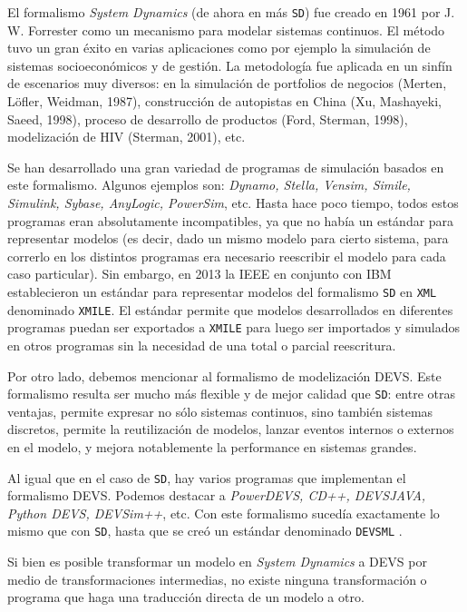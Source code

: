 
El formalismo \textit{System Dynamics} (de ahora en más \texttt{SD}) fue creado en 1961 por J. W.
Forrester como un mecanismo para modelar sistemas continuos. El método tuvo un
gran éxito en varias aplicaciones como por ejemplo la simulación de sistemas
socioeconómicos y de gestión. La metodología fue aplicada en un sinfín de
escenarios muy diversos: en la simulación de portfolios de negocios (Merten,
Löfler, Weidman, 1987), construcción de autopistas en China (Xu, Mashayeki,
Saeed, 1998), proceso de desarrollo de productos (Ford, Sterman, 1998),
modelización de HIV (Sterman, 2001), etc.


Se han desarrollado una gran variedad de programas de simulación basados en este formalismo. Algunos ejemplos son: \textit{Dynamo, Stella, Vensim, Simile, Simulink, Sybase, AnyLogic, PowerSim}, etc. Hasta hace poco tiempo, todos estos programas eran absolutamente incompatibles, ya que no había un estándar para representar modelos (es decir, dado un mismo modelo para cierto sistema, para correrlo en los distintos programas era necesario reescribir el modelo para cada caso particular). Sin embargo, en 2013 la IEEE en conjunto con IBM establecieron un estándar para representar modelos del formalismo \texttt{SD} en \texttt{XML} denominado \texttt{XMILE}\cite{xmile}. El estándar permite que modelos desarrollados en diferentes programas puedan ser exportados a \texttt{XMILE} para luego ser importados y simulados en otros programas sin la necesidad de una total o parcial reescritura.

Por otro lado, debemos mencionar al formalismo de modelización DEVS\cite{devs76}. Este formalismo resulta ser mucho más flexible y de mejor calidad que \texttt{SD}: entre otras ventajas, permite expresar no sólo sistemas continuos, sino también sistemas discretos, permite la reutilización de modelos, lanzar eventos internos o externos en el modelo, y mejora notablemente la performance en sistemas grandes.

Al igual que en el caso de \texttt{SD}, hay varios programas que implementan el formalismo DEVS. Podemos destacar a \textit{PowerDEVS, CD++, DEVSJAVA, Python DEVS,  DEVSim++}, etc. Con este formalismo sucedía exactamente lo mismo que con \texttt{SD}, hasta que se creó un estándar denominado \texttt{DEVSML} \cite{devsml}.

Si bien es posible transformar un modelo en \textit{System Dynamics} a DEVS por medio de transformaciones intermedias, no existe ninguna transformación o programa que haga una traducción directa de un modelo a otro. 

